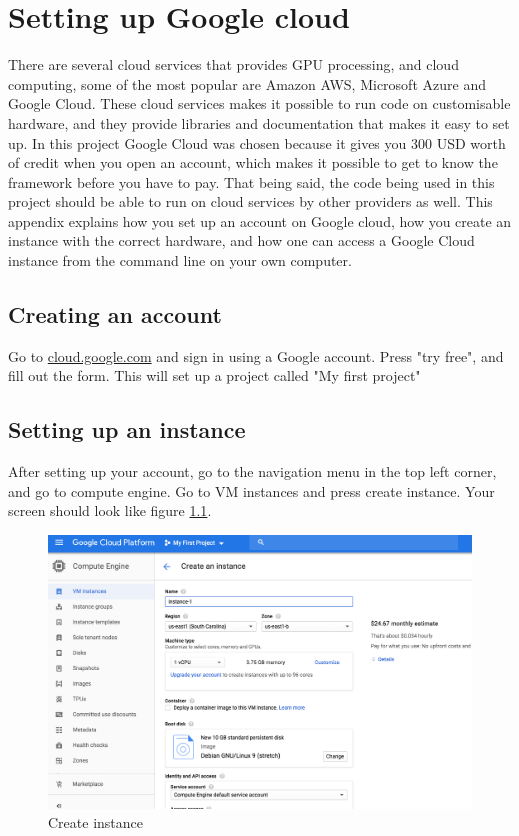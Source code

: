 
\chapter{Setting up Google cloud}
\label{ap_gcloud}
There are several cloud services that provides GPU processing, and cloud computing, some of the most popular are Amazon AWS, Microsoft Azure and Google Cloud. These cloud services makes it possible to run code on customisable hardware, and they provide libraries and documentation that makes it easy to set up. In this project Google Cloud was chosen because it gives you 300 USD worth of credit when you open an account, which makes it possible to get to know the framework before you have to pay. That being said, the code being used in this project should be able to run on cloud services by other providers as well. This appendix explains how you set up an account on Google cloud, how you create an instance with the correct hardware, and how one can access a Google Cloud instance from the command line on your own computer. 

\section{Creating an account}
Go to \url{cloud.google.com} and sign in using a Google account. Press "try free", and fill out the form. This will set up a project called "My first project"

\section{Setting up an instance}
After setting up your account, go to the navigation menu in the top left corner, and go to compute engine. Go to VM instances and press create instance. Your screen should look like figure \ref{fig:create_instance1}.

\begin{figure}
    \centering
    \includegraphics[scale=0.35]{images/create_instance1.png}
    \caption{Create instance}
    \label{fig:create_instance1}
\end{figure}

